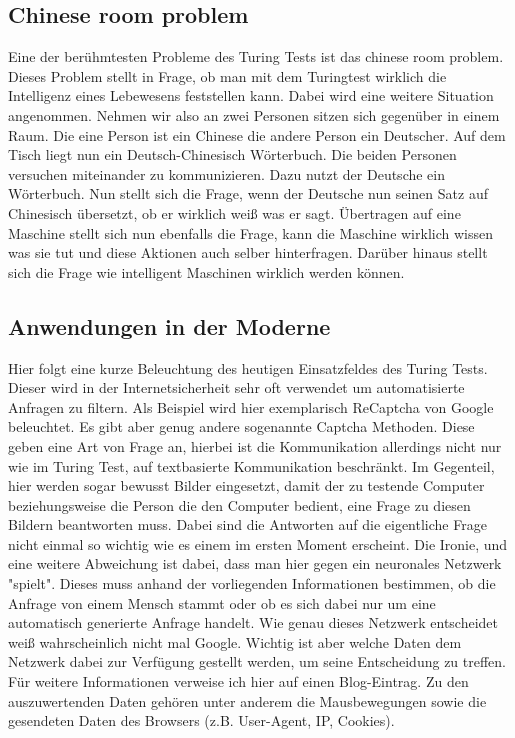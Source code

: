 \subsection{Chinese room problem}
Eine der berühmtesten Probleme des Turing Tests ist das chinese room problem. Dieses Problem stellt in Frage, ob man mit dem Turingtest wirklich die Intelligenz eines Lebewesens feststellen kann. Dabei wird eine weitere Situation angenommen. Nehmen wir also an zwei Personen sitzen sich gegenüber in einem Raum. Die eine Person ist ein Chinese die andere Person ein Deutscher. Auf dem Tisch liegt nun ein Deutsch-Chinesisch Wörterbuch. Die beiden Personen versuchen miteinander zu kommunizieren. Dazu nutzt der Deutsche ein Wörterbuch. Nun stellt sich die Frage, wenn der Deutsche nun seinen Satz auf Chinesisch übersetzt, ob er wirklich weiß was er sagt. Übertragen auf eine Maschine stellt sich nun ebenfalls die Frage, kann die Maschine wirklich wissen was sie tut und diese Aktionen auch selber hinterfragen. Darüber hinaus stellt sich die Frage wie intelligent Maschinen wirklich werden können.
\subsection{Anwendungen in der Moderne}
Hier folgt eine kurze Beleuchtung des heutigen Einsatzfeldes des Turing Tests. Dieser wird in der Internetsicherheit sehr oft verwendet um automatisierte Anfragen zu filtern. Als Beispiel wird hier exemplarisch ReCaptcha von Google beleuchtet. Es gibt aber genug andere sogenannte Captcha Methoden. Diese geben eine Art von Frage an, hierbei ist die Kommunikation allerdings nicht nur wie im Turing Test, auf textbasierte Kommunikation beschränkt. Im Gegenteil, hier werden sogar bewusst Bilder eingesetzt, damit der zu testende Computer beziehungsweise die Person die den Computer bedient, eine Frage zu diesen Bildern beantworten muss. Dabei sind die Antworten auf die eigentliche Frage nicht einmal so wichtig wie es einem im ersten Moment erscheint. Die Ironie, und eine weitere Abweichung ist dabei, dass man hier gegen ein neuronales Netzwerk "spielt". Dieses muss anhand der vorliegenden Informationen bestimmen, ob die Anfrage von einem Mensch stammt oder ob es sich dabei nur um eine automatisch generierte Anfrage handelt. Wie genau dieses Netzwerk entscheidet weiß wahrscheinlich nicht mal Google. Wichtig ist aber welche Daten dem Netzwerk dabei zur Verfügung gestellt werden, um seine Entscheidung zu treffen. Für weitere Informationen verweise ich hier auf einen Blog-Eintrag\cite{captcha}. Zu den auszuwertenden Daten gehören unter anderem die Mausbewegungen sowie die gesendeten Daten des Browsers (z.B. User-Agent, IP, Cookies).
